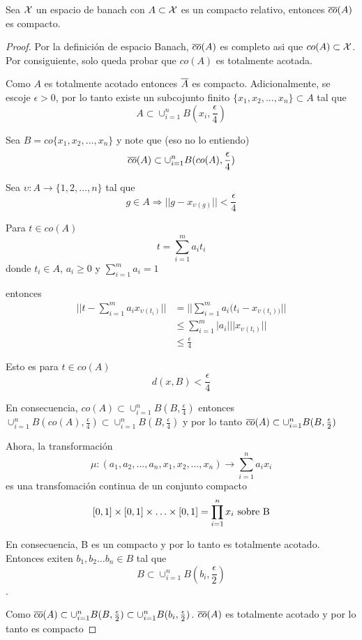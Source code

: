 \begin{teo}[Mazur] Sea $\mathcal{X}$ un espacio de banach con $A\subset\mathcal{X}$ es un compacto relativo, entonces $\overline{co}(A)$ es compacto.
\end{teo}\label{mazur}

\begin{proof} Por la definici\'on de espacio Banach, $\overline{co}(A)$ es completo asi que $co(A)\subset\mathcal{X}$. Por consiguiente, solo queda probar
que $co(A)$ es totalmente acotada.

Como $A$ es totalmente acotado entonces $\overline{A}$ es compacto. Adicionalmente, se escoje $\epsilon>0$, por lo tanto existe un subcojunto finito
$\{x_1,x_2,\ldots,x_n\}\subset A$ tal que
$$A\subset\cup^n_{i=1}{B(x_i,\frac{\epsilon}{4})}$$

Sea $B=co\{x_1,x_2,\ldots,x_n\}$ y note que (eso no lo entiendo)
$$\overline{co}(A)\subset\cup^n_{i=1}{B(co(A),\frac{\epsilon}{4})}$$

Sea $\upsilon:A\rightarrow\{1,2,\ldots,n\}$ tal que
$$g\in A\Rightarrow||g-x_{\upsilon(g)}||<\frac{\epsilon}{4}$$

Para $t\in co(A)$
$$t=\sum^m_{i=1}{a_it_i}$$
donde $t_i\in A$, $a_i\geq 0$ y $\sum^m_{i=1}{a_i}=1$

entonces
\begin{align*}
    ||t-\sum^m_{i=1}{a_ix_{\upsilon(t_i)}}||&=||\sum^m_{i=1}{a_i(t_i-x_{\upsilon(t_i))}}||\\
                                            &\leq \sum^m_{i=1}{|a_i| ||x_{\upsilon(t_i)}||}\\
                                            &\leq\frac{\epsilon}{4}
\end{align*}

Esto es para $t\in co(A)$
$$d(x,B)<\frac{\epsilon}{4}$$

En consecuencia, $co(A)\subset \cup^n_{i=1}{B(B,\frac{\epsilon}{4})}$ entonces
$\cup^n_{i=1}{B(co(A),\frac{\epsilon}{4})}\subset\cup^n_{i=1}{B(B,\frac{\epsilon}{4})}$
y por lo tanto $\overline{co}(A)\subset\cup^n_{i=1}{B(B,\frac{\epsilon}{2})}$

Ahora, la transformaci\'on
$$\mu:(a_1,a_2,\ldots,a_n,x_1,x_2,\ldots,x_n)\rightarrow\sum^{n}_{i=1}{a_ix_i}$$
es una transfomaci\'on continua de un conjunto compacto
$$[0,1]\times[0,1]\times\ldots\times[0,1]=\prod^n_{i=1}{x_i}\hbox{ sobre B}$$

En consecuencia, B es un compacto y por lo tanto es totalmente acotado. Entonces exiten $b_1,b_2\ldots b_n\in B$ tal que
$$B\subset \cup^n_{i=1}{B(b_i,\frac{\epsilon}{2})}$$.

Como $\overline{co}(A)\subset\cup^n_{i=1}{B(B,\frac{\epsilon}{2})}\subset\cup^n_{i=1}{B(b_i,\frac{\epsilon}{2})}$.
$\overline{co}(A)$ es totalmente acotado y por lo tanto es compacto

\end{proof}

 \newpage
